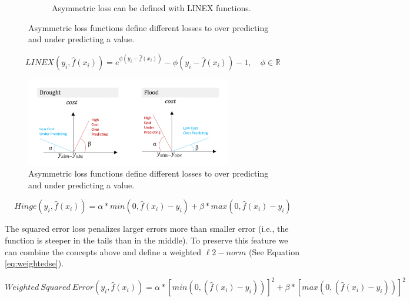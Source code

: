 \begin{figure}[ht]
\begin{subfigure}{.5\textwidth}
  		\caption{Asymmetric loss can be defined with LINEX functions.}
  		\label{fig:asymmetric1b}
	\end{subfigure}
	\caption{Asymmetric loss functions define different losses to over predicting and under predicting a value.}
	\label{fig:asymmetric1}
\end{figure}

\begin{equation} \label{eq:linex}
	LINEX(y_i,\hat{f}(x_i)) = e^{\phi(y_i-\hat{f}(x_i))} - \phi(y_i-\hat{f}(x_i))-1, \quad\text{$\phi$} \in \mathbb{R}
\end{equation}

\begin{figure}[ht]
	\centering
 	\includegraphics[width=0.8\textwidth, trim={0 0 0 0}, clip=true]{plots/asymmetric3.png}
	\caption{Asymmetric loss functions define different losses to over predicting and under predicting a value.}
	\label{fig:asymmetric3}
\end{figure}

\begin{equation} \label{eq:asshinge}
	Hinge(y_i,\hat{f}(x_i)) = \alpha*min(0, \hat{f}(x_i)-y_i)+ \beta*max(0, \hat{f}(x_i)-y_i)
\end{equation}

The squared error loss penalizes larger errors more than smaller error (i.e., the function is steeper in the tails than in the middle). To preserve this feature we can combine the concepts above and define a weighted $\ell2-norm$ (See Equation \ref{eq:weightedse}). 

\begin{equation} \label{eq:weightedse}
	Weighted\ Squared\ Error(y_i,\hat{f}(x_i)) = \alpha*\left[min\left(0, (\hat{f}(x_i)-y_i)\right)\right]^2+ \beta*\left[max\left(0, (\hat{f}(x_i)-y_i)\right)\right]^2
\end{equation}

%

